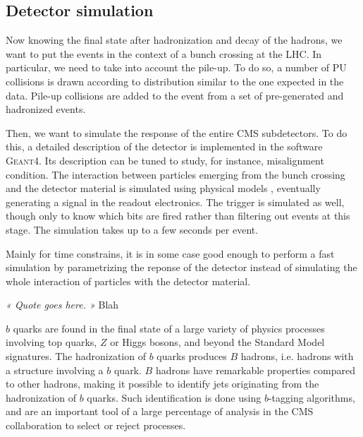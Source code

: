             \subsection{Detector simulation}

            Now knowing the final state after hadronization and decay of the hadrons, we
            want to put the events in the context of a bunch crossing at the LHC. In
            particular, we need to take into account the pile-up. To do so, a number of
            PU collisions is drawn according to distribution similar to the
            one expected in the data. Pile-up collisions are added to the event from a
            set of pre-generated and hadronized events.

            Then, we want to simulate the response of the entire CMS subdetectors. To do
            this, a detailed description of the detector is implemented in the software
            \textsc{Geant4}. Its description can be tuned to study, for instance,
            misalignment condition. The interaction between particles emerging from
            the bunch crossing and the detector material is simulated using physical
            models , eventually generating a signal in
            the readout electronics. The trigger is simulated as well, though only to know
            which bits are fired rather than filtering out events at this stage. The
            simulation takes up to a few seconds per event.

            Mainly for time constrains, it is in some case good enough to perform a
            fast simulation by parametrizing the reponse of the detector instead of
            simulating the whole interaction of particles with the detector material.

\setcounter{mtc}{5}
\hspace*{0.66\textwidth}
\begin{minipage}{0.33\textwidth}
\emph{« Quote goes here. »}
\hspace*{0.6\textwidth} Blah
\end{minipage}
\minitoc
\newpage

    $b$ quarks are found in the final state of a large variety of physics processes
    involving top quarks, $Z$ or Higgs bosons, and beyond the Standard Model signatures.
    The hadronization of $b$ quarks produces $B$ hadrons, i.e. hadrons with a structure
    involving a $b$ quark. $B$ hadrons have remarkable properties compared to other hadrons,
    making it possible to identify jets originating from the hadronization of $b$ quarks.
    Such identification is done using $b$-tagging algorithms, and are an important tool of
    a large percentage of analysis in the CMS collaboration to select or reject processes.


